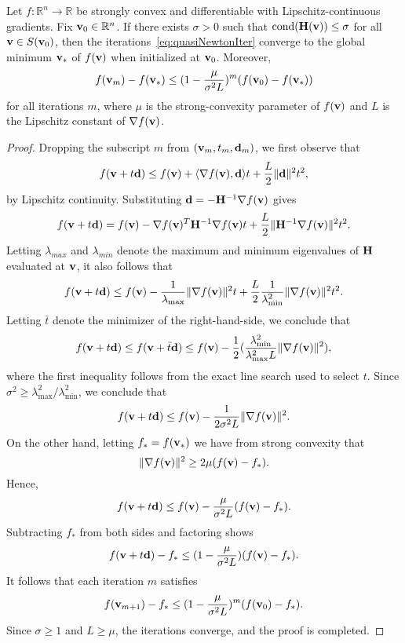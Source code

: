 \begin{lemma}\label{lem:GlobalConv}
  Let $f : \mathbb{R}^n \rightarrow \mathbb{R}$ be strongly convex and differentiable
  with Lipschitz-continuous gradients.
  Fix ${\mathbf{v}}_0 \in\mathbb{R}^n$. If there exists $\sigma > 0$
  such that $\text{cond}({\mathbf{H}}({\mathbf{v}})) \le \sigma$ for all  ${\mathbf{v}} \in S({\mathbf{v}}_0)$, then
  the iterations~\eqref{eq:quasiNewtonIter}
  converge to the global minimum ${\mathbf{v}}_*$ of $f({\mathbf{v}})$ when initialized at ${\mathbf{v}}_0$.
  Moreover,
  \[
    f({\mathbf{v}}_m)  - f({\mathbf{v}}_*)  \le (1-\frac{\mu}{\sigma^2 L})^m (f({\mathbf{v}}_0) - f({\mathbf{v}}_*))
  \]
  for all iterations $m$, where $\mu$ is the strong-convexity parameter of $f({\mathbf{v}})$ and $L$ is
  the Lipschitz constant of $\nabla f({\mathbf{v}})$.
  \begin{proof}
    Dropping the subscript $m$ from $({\mathbf{v}}_m, t_m, {\mathbf{d}}_m)$, we first observe that
\[
f({\mathbf{v}}+t{\mathbf{d}}) \le f({\mathbf{v}}) + \langle \nabla f({\mathbf{v}}), {\mathbf{d}} \rangle t + \frac{L}{2}\|{\mathbf{d}}\|^2 t^2,
\]
by Lipschitz continuity.  Substituting ${\mathbf{d}} =- {\mathbf{H}}^{-1}  \nabla  f({\mathbf{v}})$ gives
\[
f({\mathbf{v}}+t{\mathbf{d}}) = f({\mathbf{v}}) - \nabla f({\mathbf{v}})^T  {\mathbf{H}}^{-1}  \nabla  f({\mathbf{v}}) t + \frac{L }{2}\|{\mathbf{H}}^{-1}\nabla f({\mathbf{v}}) \|^2 t^2.
\]
Letting $\lambda_{max}$ and $\lambda_{min}$ denote the
maximum and minimum eigenvalues of ${\mathbf{H}}$ evaluated at ${\mathbf{v}}$, it also follows that
\[
  f({\mathbf{v}}+t{\mathbf{d}}) \le f({\mathbf{v}}) - \frac{1}{\lambda_{\max}} \|\nabla f({\mathbf{v}})\|^2 t  + 
    \frac{L }{2}  \frac{1}{\lambda^{2}_{\min}} \|\nabla f({\mathbf{v}})\|^2 t^2.
\]
Letting $\bar t$ denote the  minimizer of the right-hand-side, we
conclude that
    \[
      f({\mathbf{v}}+t{\mathbf{d}}) \le  f({\mathbf{v}} + \bar t{\mathbf{d}} ) \le f({\mathbf{v}}) - \frac{1}{2}(\frac{\lambda^{2}_{\min}}{\lambda^2_{\max} L} 
      \|\nabla f({\mathbf{v}})\|^2),
    \]
where the first inequality follows from the exact line search
used to select $t$.
Since  $\sigma^2 \ge \lambda^{2}_{\max}/\lambda^2_{\min}$,
we conclude that
\[
   f({\mathbf{v}} + t {\mathbf{d}}) \le f({\mathbf{v}}) - \frac{1}{2\sigma^2 L}\| \nabla f({\mathbf{v}}) \|^2.
\]
    On the other hand, letting $f_* = f({\mathbf{v}}_*)$ 
    we have from strong convexity that
    \[
  \|\nabla f({\mathbf{v}})\|^2 \ge 2\mu (f({\mathbf{v}})-f_* ).
    \]
Hence,
\[
  f({\mathbf{v}} + t {\mathbf{d}})   \le f({\mathbf{v}}) - \frac{\mu}{\sigma^2 L} (f({\mathbf{v}})-f_* ).
\]
Subtracting $f_*$ from both sides and factoring shows
\[
  f({\mathbf{v}} + t {\mathbf{d}})  - f_* \le  (1-\frac{\mu}{\sigma^2 L})(f({\mathbf{v}}) - f_*).
\]
It follows that each iteration $m$ satisfies
\[
  f({\mathbf{v}}_{m+1}) - f_* \le  (1-\frac{\mu}{\sigma^2 L})^{m}(f({\mathbf{v}}_{0}) - f_*).
\]
Since $\sigma \ge 1$ and $L \ge \mu$, the iterations converge, and the proof is completed.
  \end{proof}
\end{lemma}


